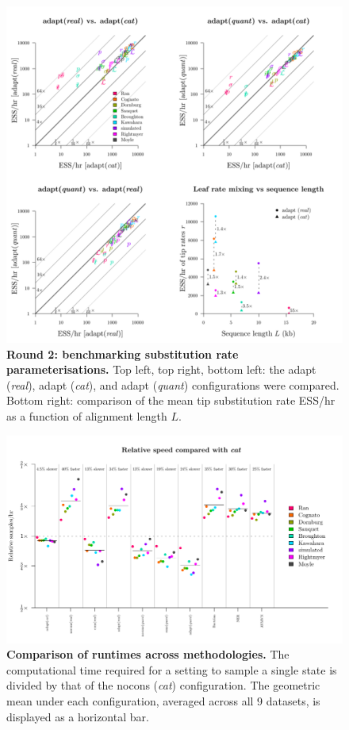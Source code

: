 \documentclass[10pt,letterpaper]{article}
\begin{document}
\begin{figure}[!h]
\includegraphics[width=\textwidth]{benchmarking/benchmarkingVM/ESS_round2.pdf}
\caption{\textbf{Round 2: benchmarking substitution rate parameterisations.} Top left, top right, bottom left: the adapt (\textit{real}), adapt (\textit{cat}), and adapt (\textit{quant}) configurations were compared. Bottom right: comparison of the mean tip substitution rate ESS/hr as a function of alignment length $L$. }
\label{fig:round2Results}
\end{figure}




\begin{figure}[!h]
\includegraphics[width=\textwidth]{benchmarking/benchmarkingVM/ESS_timesettings.pdf}
\caption{\textbf{Comparison of runtimes across methodologies.} 
The computational time required for a setting to sample a single state is divided by that of the nocons (\textit{cat}) configuration.
The geometric mean under each configuration, averaged across all 9 datasets, is displayed as a horizontal bar.}
\label{fig:round2Resultsb}
\end{figure}
\end{document}
